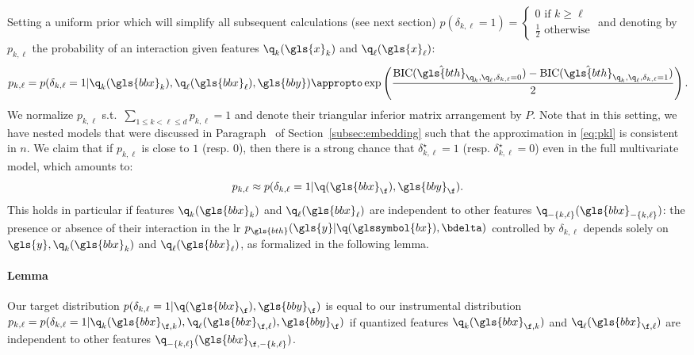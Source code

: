 Setting a uniform prior which will simplify all subsequent calculations (see next section) $p(\delta_{k,\ell}=1) =\begin{cases} 0 \text{ if } k \geq \ell \\ \frac{1}{2} \text{ otherwise} \end{cases}$ and denoting by $p_{k,\ell}$ the probability of an interaction given features $\q_k(\gls{x}_k)$ and $\q_\ell(\gls{x}_\ell)$:
\begin{equation} \label{eq:pkl}
p_{k,\ell} = p(\delta_{k,\ell} = 1 | \q_k(\gls{bbx}_k), \q_\ell(\gls{bbx}_\ell), \gls{bby}) \appropto \exp \left( \frac{\text{BIC}(\hat{\gls{bth}}_{\q_k,\q_\ell,\delta_{k,\ell}=0}) - \text{BIC}(\hat{\gls{bth}}_{\q_k,\q_\ell,\delta_{k,\ell}=1})}{2} \right).
\end{equation}
We normalize $p_{k,\ell}$ s.t.\ $\sum_{1 \leq k < \ell \leq d} p_{k,\ell} = 1$ and denote their triangular inferior matrix arrangement by $P$. Note that in this setting, we have nested models that were discussed in Paragraph~ of Section~\ref{subsec:embedding} such that the approximation in \eqref{eq:pkl} is consistent in $n$.
We claim that if $p_{k,\ell}$ is close to $1$ (resp. $0$), then there is a strong chance that $\delta_{k,\ell}^\star = 1$ (resp. $\delta_{k,\ell}^\star = 0$) even in the full multivariate model, which amounts to:
\[ p_{k,\ell} \approx p(\delta_{k,\ell} = 1 | \q(\gls{bbx}_\f),\gls{bby}_\f) .\]
This holds in particular if features $\q_k(\gls{bbx}_k)$ and $\q_\ell(\gls{bbx}_\ell)$ are independent to other features $\q_{-\{k,\ell\}}(\gls{bbx}_{-\{k,\ell\}})$: the presence or absence of their interaction in the \gls{lr} $p_{\gls{bth}}(\gls{y} | \q(\glssymbol{bx}), \bdelta)$ controlled by $\delta_{k,\ell}$ depends solely on $\gls{y}, \q_k(\gls{bbx}_k)$ and $\q_\ell(\gls{bbx}_\ell)$, as formalized in the following lemma.

\paragraph{Lemma} Our target distribution $p(\delta_{k,\ell} = 1 | \q(\gls{bbx}_\f),\gls{bby}_\f)$ is equal to our instrumental distribution $p_{k,\ell} = p(\delta_{k,\ell} = 1 | \q_k(\gls{bbx}_{\f,k}), \q_\ell(\gls{bbx}_{\f,\ell}), \gls{bby}_\f)$ if quantized features $\q_k(\gls{bbx}_{\f,k})$ and $\q_\ell(\gls{bbx}_{\f,\ell})$ are independent to other features $\q_{-\{k,\ell\}}(\gls{bbx}_{\f,-\{k,\ell\}})$.

